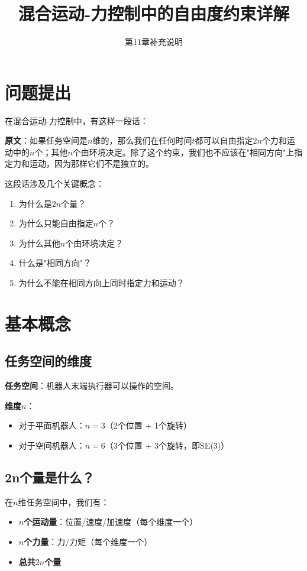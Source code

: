 \documentclass[12pt,a4paper]{article}
\title{混合运动-力控制中的自由度约束详解}
\author{第11章补充说明}
\date{}
\begin{document}
\maketitle

\section{问题提出}

在混合运动-力控制中，有这样一段话：

\textbf{原文}：如果任务空间是$n$维的，那么我们在任何时间$t$都可以自由指定$2n$个力和运动中的$n$个；其他$n$个由环境决定。除了这个约束，我们也不应该在"相同方向"上指定力和运动，因为那样它们不是独立的。

这段话涉及几个关键概念：
\begin{enumerate}
\item 为什么是$2n$个量？
\item 为什么只能自由指定$n$个？
\item 为什么其他$n$个由环境决定？
\item 什么是"相同方向"？
\item 为什么不能在相同方向上同时指定力和运动？
\end{enumerate}

\section{基本概念}

\subsection{任务空间的维度}

\textbf{任务空间}：机器人末端执行器可以操作的空间。

\textbf{维度$n$}：
\begin{itemize}
\item 对于平面机器人：$n = 3$（2个位置 + 1个旋转）
\item 对于空间机器人：$n = 6$（3个位置 + 3个旋转，即SE(3)）
\end{itemize}

\subsection{2n个量是什么？}

在$n$维任务空间中，我们有：
\begin{itemize}
\item \textbf{$n$个运动量}：位置/速度/加速度（每个维度一个）
\item \textbf{$n$个力量}：力/力矩（每个维度一个）
\item \textbf{总共$2n$个量}
\end{itemize}
\end{document}
